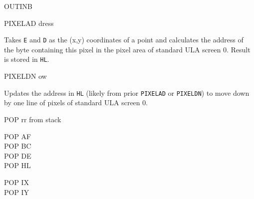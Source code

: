 \begin{basedescript}{
    \desclabelstyle{\multilinelabel}
    \desclabelwidth{3cm}}
\begin{DetailItem}{OUTINB\ZXN}
    \end{DetailItem}

    \begin{DetailItem}{PIXELAD\ZXN}
        { dress}
        {\SymPIXELAD}

        Takes {\tt E} and {\tt D} as the (x,y) coordinates of a point and calculates the address of the byte containing this pixel in the pixel area of standard ULA screen 0. Result is stored in {\tt HL}.

        \begin{DetailEffects}
            \FlagsPIXELAD
        \end{DetailEffects}
				
        \begin{DetailTiming}
        \end{DetailTiming}

    \end{DetailItem}
	
    \pagebreak
    \begin{DetailItem}{PIXELDN\ZXN}
        { ow}
        {\SymPIXELDN}

        Updates the address in {\tt HL} (likely from prior {\tt PIXELAD} or {\tt PIXELDN}) to move down by one line of pixels of standard ULA screen 0.

        \begin{DetailEffects}
            \FlagsPIXELDN
        \end{DetailEffects}
				
        \begin{DetailTiming}
        \end{DetailTiming}

    \end{DetailItem}

    \begin{DetailItem}{POP rr}
        { from stack}
        {}

        \begin{DetailVariants}
            POP AF\\
            POP BC\\
            POP DE\\
            POP HL

            \columnbreak
            POP IX\\
            POP IY

            \columnbreak
            ~
        \end{DetailVariants}


\end{DetailItem}
\end{basedescript}
